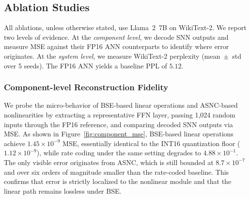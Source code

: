 \documentclass{article}
\theoremstyle{plain}
\theoremstyle{definition}
\theoremstyle{remark}
\begin{document}
\subsection{Ablation Studies}
\label{subsec:ablation_studies}

All ablations, unless otherwise stated, use Llama~2~7B on WikiText-2. We report two levels of evidence. At the \emph{component level}, we decode SNN outputs and measure MSE against their FP16 ANN counterparts to identify where error originates. At the \emph{system level}, we measure WikiText-2 perplexity (mean~$\pm$~std over 5 seeds). The FP16 ANN yields a baseline PPL of $5.12$.

\subsubsection{Component-level Reconstruction Fidelity}

We probe the micro-behavior of BSE-based linear operations and ASNC-based nonlinearities by extracting a representative FFN layer, passing 1{,}024 random inputs through the FP16 reference, and comparing decoded SNN outputs via MSE. As shown in Figure~\ref{fig:component_mse}, BSE-based linear operations achieve $1.45\times10^{-9}$ MSE, essentially identical to the INT16 quantization floor ($1.12\times10^{-9}$), while rate coding under the same setting degrades to $4.88\times10^{-1}$. The only visible error originates from ASNC, which is still bounded at $8.7\times10^{-7}$ and over six orders of magnitude smaller than the rate-coded baseline. This confirms that error is strictly localized to the nonlinear module and that the linear path remains lossless under BSE.

\end{document}
